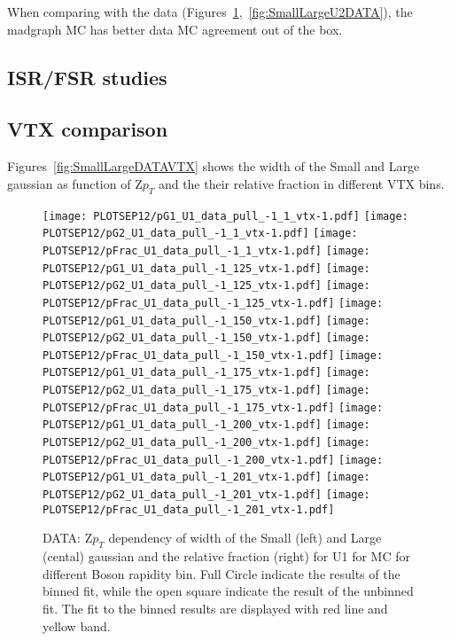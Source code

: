 \documentclass[41pt,a4paper,oneside]{report}
\begin{document}
When comparing with the data (Figures~\ref{fig:SmallLargeU1DATA},~\ref{fig:SmallLargeU2DATA}), the madgraph MC has better data MC agreement out of the box.

\subsection{ISR/FSR studies}
\label{sec:ISR/FSR}

\subsection{VTX comparison}
\label{sec:VTXComp}
Figures~\ref{fig:SmallLargeDATAVTX} shows the width of the Small and Large gaussian as function of Z$p_{T}$ and the their relative fraction in different VTX bins.


\begin{figure}[h!]
  \begin{center}
    \texttt{[image: PLOTSEP12/pG1\_U1\_data\_pull\_-1\_1\_vtx-1.pdf]}
    \texttt{[image: PLOTSEP12/pG2\_U1\_data\_pull\_-1\_1\_vtx-1.pdf]}
    \texttt{[image: PLOTSEP12/pFrac\_U1\_data\_pull\_-1\_1\_vtx-1.pdf]} 
    \texttt{[image: PLOTSEP12/pG1\_U1\_data\_pull\_-1\_125\_vtx-1.pdf]}
    \texttt{[image: PLOTSEP12/pG2\_U1\_data\_pull\_-1\_125\_vtx-1.pdf]}
    \texttt{[image: PLOTSEP12/pFrac\_U1\_data\_pull\_-1\_125\_vtx-1.pdf]} 
    \texttt{[image: PLOTSEP12/pG1\_U1\_data\_pull\_-1\_150\_vtx-1.pdf]}
    \texttt{[image: PLOTSEP12/pG2\_U1\_data\_pull\_-1\_150\_vtx-1.pdf]}
    \texttt{[image: PLOTSEP12/pFrac\_U1\_data\_pull\_-1\_150\_vtx-1.pdf]} 
    \texttt{[image: PLOTSEP12/pG1\_U1\_data\_pull\_-1\_175\_vtx-1.pdf]}
    \texttt{[image: PLOTSEP12/pG2\_U1\_data\_pull\_-1\_175\_vtx-1.pdf]}
    \texttt{[image: PLOTSEP12/pFrac\_U1\_data\_pull\_-1\_175\_vtx-1.pdf]} 
    \texttt{[image: PLOTSEP12/pG1\_U1\_data\_pull\_-1\_200\_vtx-1.pdf]}
    \texttt{[image: PLOTSEP12/pG2\_U1\_data\_pull\_-1\_200\_vtx-1.pdf]}
    \texttt{[image: PLOTSEP12/pFrac\_U1\_data\_pull\_-1\_200\_vtx-1.pdf]} 
    \texttt{[image: PLOTSEP12/pG1\_U1\_data\_pull\_-1\_201\_vtx-1.pdf]}
    \texttt{[image: PLOTSEP12/pG2\_U1\_data\_pull\_-1\_201\_vtx-1.pdf]}
    \texttt{[image: PLOTSEP12/pFrac\_U1\_data\_pull\_-1\_201\_vtx-1.pdf]} 
    \caption{DATA: Z$p_{T}$ dependency of width of the Small (left) and Large (cental) gaussian and the relative fraction (right) for U1 for MC for different Boson rapidity bin. Full Circle indicate the results of the binned fit, while the open square indicate the result of the unbinned fit. The fit to the binned results are displayed with red line and yellow band.
\newline
}
    \label{fig:SmallLargeU1DATA}
  \end{center}
\end{figure}
\end{document}
